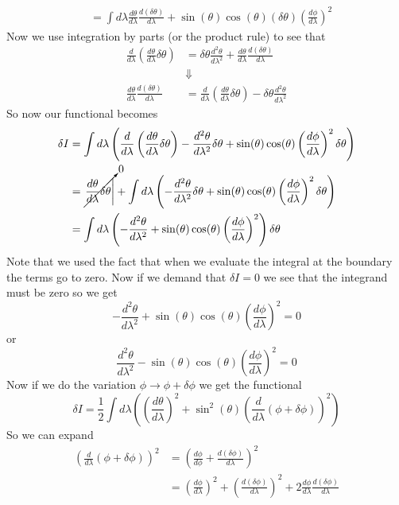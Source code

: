 \documentclass[11pt]{article}
\numberwithin{equation}{section}
\begin{document}
\begin{enumerate}[(a)]
\begin{align*}
&= \int d\lambda \frac{d\theta}{d\lambda}\frac{d(\delta\theta)}{d\lambda} + \sin(\theta)\cos(\theta)(\delta\theta)\left(\frac{d\phi}{d\lambda}\right)^2
\end{align*}
Now we use integration by parts (or the product rule) to see that
\begin{align*}
\frac{d}{d\lambda}\left(\frac{d\theta}{d\lambda}\delta\theta\right) &= \delta\theta\frac{d^2\theta}{d\lambda^2} + \frac{d\theta}{d\lambda}\frac{d(\delta\theta)}{d\lambda}\\
&\Downarrow\\
 \frac{d\theta}{d\lambda}\frac{d(\delta\theta)}{d\lambda} &=  \frac{d}{d\lambda}\left(\frac{d\theta}{d\lambda}\delta\theta\right) - \delta\theta\frac{d^2\theta}{d\lambda^2}
\end{align*}
So now our functional becomes
\begin{align*}
\delta I &= \int d\lambda \left(\frac{d}{d\lambda}\left(\frac{d\theta}{d\lambda}\delta\theta\right) - \frac{d^2\theta}{d\lambda^2}\delta\theta + \sin(\theta)\cos(\theta)\left(\frac{d\phi}{d\lambda}\right)^2\delta\theta\right)\\
&= \cancelto{0}{\left.\frac{d\theta}{d\lambda}\delta\theta\right|} + \int d\lambda \left(-\frac{d^2\theta}{d\lambda^2}\delta\theta  + \sin(\theta)\cos(\theta)\left(\frac{d\phi}{d\lambda}\right)^2\delta\theta\right)\\
&= \int d\lambda \left(-\frac{d^2\theta}{d\lambda^2} + \sin(\theta)\cos(\theta)\left(\frac{d\phi}{d\lambda}\right)^2\right)\delta\theta
\end{align*}
Note that we used the fact that when we evaluate the integral at the boundary the terms go to zero. Now if we demand that $\delta I =0$ we see that the integrand must be zero so we get
$$-\frac{d^2\theta}{d\lambda^2} + \sin(\theta)\cos(\theta)\left(\frac{d\phi}{d\lambda}\right)^2 = 0$$
or 
$$\frac{d^2\theta}{d\lambda^2} - \sin(\theta)\cos(\theta)\left(\frac{d\phi}{d\lambda}\right)^2 = 0$$
Now if we do the variation $\phi\rightarrow\phi+\delta\phi$ we get the functional
$$\delta I = \frac{1}{2}\int d\lambda \left(\left(\frac{d\theta}{d\lambda}\right)^2 + \sin^2(\theta)\left(\frac{d}{d\lambda}(\phi+\delta\phi)\right)^2\right)$$
So we can expand 
\begin{align*}
\left(\frac{d}{d\lambda}(\phi+\delta\phi)\right)^2 &= \left(\frac{d\phi}{d\phi} + \frac{d(\delta\phi)}{d\lambda}\right)^2\\
&= \left(\frac{d\phi}{d\lambda}\right)^2 + \left(\frac{d(\delta\phi)}{d\lambda}\right)^2 + 2\frac{d\phi}{d\lambda}\frac{d(\delta\phi)}{d\lambda}

\end{align*}
\end{enumerate}
\end{document}

